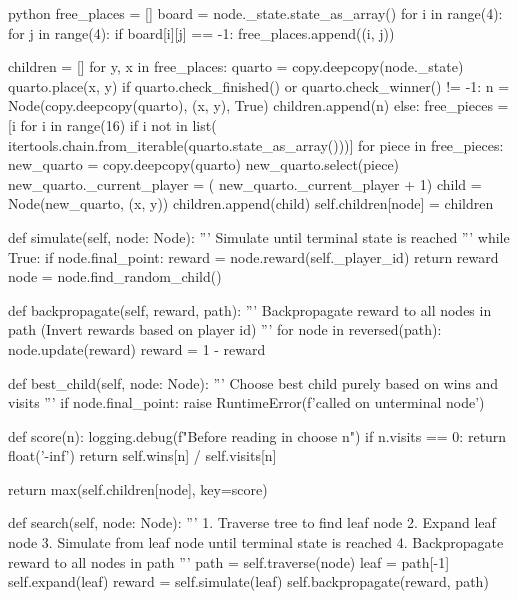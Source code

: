 \begin{mintedbox}{python}
        free_places = []
        board = node._state.state_as_array()
        for i in range(4):
            for j in range(4):
                if board[i][j] == -1:
                    free_places.append((i, j))

        children = []
        for y, x in free_places:
            quarto = copy.deepcopy(node._state)
            quarto.place(x, y)
            if quarto.check_finished() or quarto.check_winner() != -1:
                n = Node(copy.deepcopy(quarto), (x, y), True)
                children.append(n)
            else:
                free_pieces = [i for i in range(16) if i not in list(
                    itertools.chain.from_iterable(quarto.state_as_array()))]
                for piece in free_pieces:
                    new_quarto = copy.deepcopy(quarto)
                    new_quarto.select(piece)
                    new_quarto._current_player = (
                        new_quarto._current_player + 1) %
                    child = Node(new_quarto, (x, y))
                    children.append(child)
        self.children[node] = children

    def simulate(self, node: Node):
        '''
        Simulate until terminal state is reached
        '''
        while True:
            if node.final_point:
                reward = node.reward(self._player_id)
                return reward
            node = node.find_random_child()

    def backpropagate(self, reward, path):
        '''
        Backpropagate reward to all nodes in path
        (Invert rewards based on player id)
        '''
        for node in reversed(path):
            node.update(reward)
            reward = 1 - reward

    def best_child(self, node: Node):
        '''
        Choose best child purely based on wins and visits
        '''
        if node.final_point:
            raise RuntimeError(f'called on unterminal node')

        def score(n):
            logging.debug(f"Before reading in choose {n}")
            if n.visits == 0:
                return float('-inf')
            return self.wins[n] / self.visits[n]

        return max(self.children[node], key=score)

    def search(self, node: Node):
        '''
        1. Traverse tree to find leaf node
        2. Expand leaf node
        3. Simulate from leaf node until terminal state is reached
        4. Backpropagate reward to all nodes in path
        '''
        path = self.traverse(node)
        leaf = path[-1]
        self.expand(leaf)
        reward = self.simulate(leaf)
        self.backpropagate(reward, path)


\end{mintedbox}
